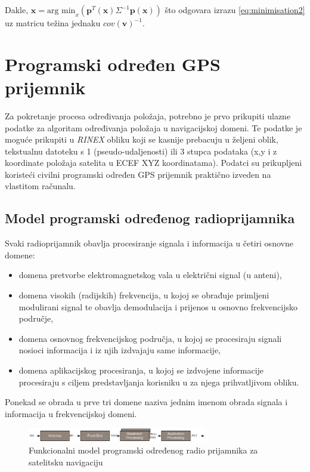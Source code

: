 \documentclass[a4paper,twoside,12pt]{memoir} %
\begin{document}
Dakle, $\hat{\mathbf{x}} = \text{arg min}_x \left( \mathbf{p}^T (\mathbf{x}) \Sigma^{-1}\mathbf{p} (\mathbf{x}) \right)$ 
što odgovara izrazu \ref{eq:minimisation2} uz matricu težina jednaku $cov(\mathbf{v})^{-1}$.

\chapter{Programski određen GPS prijemnik}
Za pokretanje procesa određivanja položaja, potrebno je prvo prikupiti ulazne podatke za algoritam određivanja položaja u navigacijskoj domeni. Te podatke je moguće prikupiti u \textit{RINEX} obliku koji se kasnije prebacuju u željeni oblik, tekstualnu datoteku s 1 (pseudo-udaljenosti) ili 3 stupca podataka (x,y i z koordinate položaja satelita u ECEF XYZ koordinatama). Podatci su prikupljeni koristeći civilni programski određen GPS prijemnik praktično izveden na vlastitom računalu.

\section{Model programski određenog radioprijamnika}
Svaki radioprijamnik obavlja procesiranje signala i informacija u četiri osnovne domene:
\begin{itemize}
	\item domena pretvorbe elektromagnetskog vala u električni signal (u anteni),
	\item domena visokih (radijskih) frekvencija, u kojoj se obrađuje primljeni modulirani signal te obavlja demodulacija i prijenos u osnovno frekvencijsko područje,
	\item domena osnovnog frekvencijskog područja, u kojoj se procesiraju signali nosioci informacija i iz njih izdvajaju same informacije,
	\item domena aplikacijskog procesiranja, u kojoj se izdvojene informacije procesiraju s ciljem predstavljanja korisniku u za njega prihvatljivom obliku.
\end{itemize} 
Ponekad se obrada u prve tri domene naziva jednim imenom obrada signala i informacija u frekvencijskoj domeni.

\begin{figure}[H]
	\centering
	\includegraphics[width=0.7\textwidth]{modelPOR}
	\caption{Funkcionalni model programski određenog radio prijamnika za satelitsku navigaciju}
	\label{Fig:modelPOR}	
\end{figure}
\end{document}
